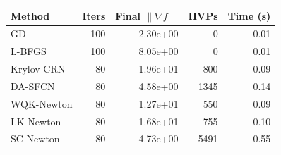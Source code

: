 \begin{tabular}{@{}lrrrr@{}}
\toprule
Method & Iters & Final $\|\nabla f\|$ & HVPs & Time (s) \\
\midrule
GD & 100 & 2.30e+00 & 0 & 0.01 \\
L-BFGS & 100 & 8.05e+00 & 0 & 0.01 \\
Krylov-CRN & 80 & 1.96e+01 & 800 & 0.09 \\
DA-SFCN & 80 & 4.58e+00 & 1345 & 0.14 \\
WQK-Newton & 80 & 1.27e+01 & 550 & 0.09 \\
LK-Newton & 80 & 1.68e+01 & 755 & 0.10 \\
SC-Newton & 80 & 4.73e+00 & 5491 & 0.55 \\
\bottomrule
\end{tabular}